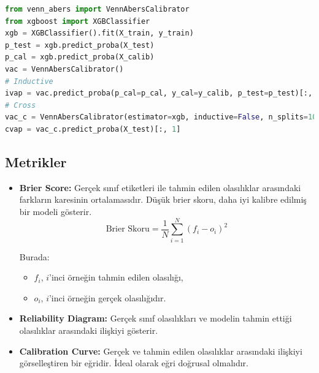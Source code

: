 \begin{lstlisting}[language=Python, caption=venn\_abers kütüphanesi ile örnek.]
from venn_abers import VennAbersCalibrator
from xgboost import XGBClassifier
xgb = XGBClassifier().fit(X_train, y_train)
p_test = xgb.predict_proba(X_test)
p_cal = xgb.predict_proba(X_calib)
vac = VennAbersCalibrator()
# Inductive
ivap = vac.predict_proba(p_cal=p_cal, y_cal=y_calib, p_test=p_test)[:, 1]
# Cross
vac_c = VennAbersCalibrator(estimator=xgb, inductive=False, n_splits=10).fit(X_train, y_train)
cvap = vac_c.predict_proba(X_test)[:, 1]
\end{lstlisting}

\subsection{Metrikler}
\begin{itemize}
    \item \textbf{Brier Score:} Gerçek sınıf etiketleri ile tahmin edilen olasılıklar arasındaki farkların karesinin ortalamasıdır. Düşük brier skoru, daha iyi kalibre edilmiş bir modeli gösterir.
    \begin{equation*}
    \text{Brier Skoru} = \frac{1}{N} \sum_{i=1}^{N} (f_i - o_i)^2
    \end{equation*}
    
    Burada:
    \begin{itemize}
        \item $f_i$, $i$'inci örneğin tahmin edilen olasılığı,
        \item $o_i$, $i$'inci örneğin gerçek olasılığıdır.
    \end{itemize}
    \item \textbf{Reliability Diagram:} Gerçek sınıf olasılıkları ve modelin tahmin ettiği olasılıklar arasındaki ilişkiyi gösterir.
    \item \textbf{Calibration Curve:} Gerçek ve tahmin edilen olasılıklar arasındaki ilişkiyi görselleştiren bir eğridir. İdeal olarak eğri doğrusal olmalıdır.
\end{itemize}

\newpage